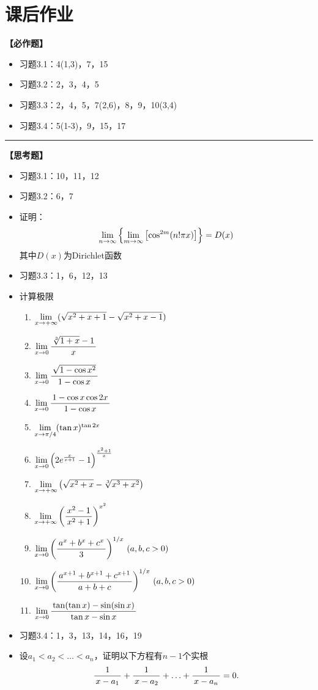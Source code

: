 \newpage

\section*{课后作业}

{\bf 【必作题】}

\begin{itemize}
  \item 习题3.1：4(1,3)，7，15
  \item 习题3.2：2，3，4，5
  \item 习题3.3：2，4，5，7(2,6)，8，9，10(3,4)
  \item 习题3.4：5(1-3)，9，15，17
\end{itemize}

\bigskip

\hrule

\bigskip
\bigskip

{\bf 【思考题】}
\begin{itemize}
  \item 习题3.1：10，11，12
  \item 习题3.2：6，7
  \item 证明：$$\lim\limits_{n\to\infty}\left\{\lim\limits_{m\to\infty}\left[\cos^{2m}(n!\pi
	x)\right]\right\}=D(x)$$
	其中$D(x)$为Dirichlet函数
  \item 习题3.3：1，6，12，13
  \item  计算极限
	\begin{enumerate}[(1)]
	  \item $\lim\limits_{x\to{+\infty}}(\sqrt{x^2+x+1}-\sqrt{x^2+x-1})$ 
	  \item $\lim\limits_{x\to{0}}\displaystyle\frac{\,{\sqrt[3]{1+x}-1}\,}{\,{x}\,}$ 
	  \item $\lim\limits_{x\to{0}}\displaystyle\frac{\,{\sqrt{1-\cos x^2}}\,}{\,{1-\cos x}\,}$ 
	  \item $\lim\limits_{x\to{0}}\displaystyle\frac{\,{1-\cos x\cos 2x}\,}{\,{1-\cos x}\,}$
	  \item $\lim\limits_{x\to{\pi /4}}(\tan x)^{\tan 2x}$ 
	  \item $\lim\limits_{x\to{0}}\left(2e^{\frac{x}{x+1}}-1\right)^{\frac{x^2+1}{x}}$ 
	  \item $\lim\limits_{x\to{+\infty}}\left(\sqrt{x^2+x}-\sqrt[3]{x^3+x^2}\right)
		$ 
	  \item $\lim\limits_{x\to{+\infty}}\left(\displaystyle\frac{\,{x^2-1}\,}{\,{x^2+1}\,}\right)^{x^2}$
	  \item $\lim\limits_{x\to{0}}\left(\displaystyle\frac{\,{a^x+b^x+c^x}\,}{\,{3}\,}\right)^{1/x}\,(a,b,c>0)$ 
	  \item $\lim\limits_{x\to{0}}\left(\displaystyle\frac{\,{a^{x+1}+b^{x+1}+c^{x+1}}\,}{\,{a+b+c}\,}\right)^{1/x}
	  \,(a,b,c>0)$ 
	  \item $\lim\limits_{x\to{0}}\displaystyle\frac{\,{\tan(\tan x)-\sin(\sin x)}\,}{\,{\tan x-\sin x}\,}$
	\end{enumerate}
  \item 习题3.4：1，3，13，14，16，19
  \item 设$a_1<a_2<\ldots<a_n$，证明以下方程有$n-1$个实根
	$$\displaystyle\frac{\,{1}\,}{\,{x-a_1}\,}+\displaystyle\frac{\,{1}\,}{\,{x-a_2}\,}+\ldots+\displaystyle\frac{\,{1}\,}{\,{x-a_n}\,}=0.$$
\end{itemize}


